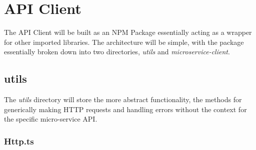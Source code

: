 \section{API Client}
The API Client will be built as an NPM Package essentially acting as a wrapper for other imported libraries. The architecture will be simple, with the package essentially broken down into two directories, \emph{utils} and \emph{microservice-client}.
\subsection{utils}
The \emph{utils} directory will store the more abstract functionality, the methods for generically making HTTP requests and handling errors without the context for the specific micro-service API.
\subsubsection{Http.ts}
